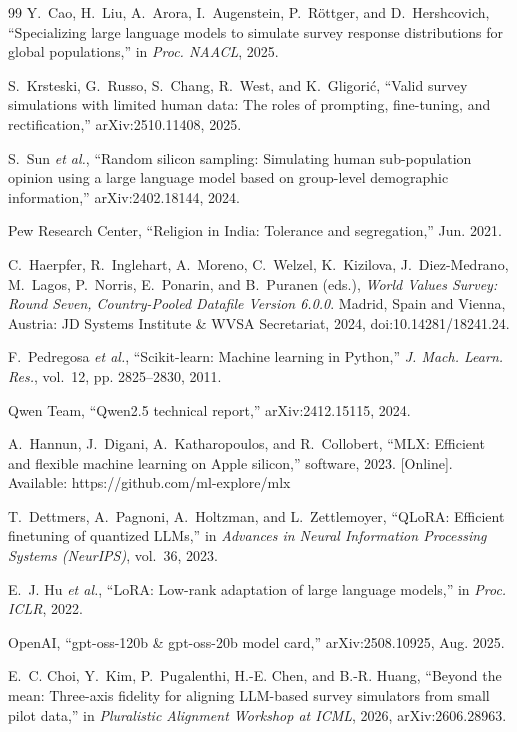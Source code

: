 \documentclass[conference]{IEEEtran}
\begin{document}
\begin{thebibliography}{99}
Y.~Cao, H.~Liu, A.~Arora, I.~Augenstein, P.~R\"{o}ttger, and D.~Hershcovich, ``Specializing large language models to simulate survey response distributions for global populations,'' in \emph{Proc. NAACL}, 2025.

S.~Krsteski, G.~Russo, S.~Chang, R.~West, and K.~Gligori\'{c}, ``Valid survey simulations with limited human data: The roles of prompting, fine-tuning, and rectification,'' arXiv:2510.11408, 2025.

S.~Sun \emph{et al.}, ``Random silicon sampling: Simulating human sub-population opinion using a large language model based on group-level demographic information,'' arXiv:2402.18144, 2024.

Pew Research Center, ``Religion in India: Tolerance and segregation,'' Jun. 2021.

C.~Haerpfer, R.~Inglehart, A.~Moreno, C.~Welzel, K.~Kizilova, J.~Diez-Medrano, M.~Lagos, P.~Norris, E.~Ponarin, and B.~Puranen (eds.), \emph{World Values Survey: Round Seven, Country-Pooled Datafile Version 6.0.0}. Madrid, Spain and Vienna, Austria: JD Systems Institute \& WVSA Secretariat, 2024, doi:10.14281/18241.24.

F.~Pedregosa \emph{et al.}, ``Scikit-learn: Machine learning in Python,'' \emph{J. Mach. Learn. Res.}, vol.~12, pp. 2825--2830, 2011.

Qwen Team, ``Qwen2.5 technical report,'' arXiv:2412.15115, 2024.

A.~Hannun, J.~Digani, A.~Katharopoulos, and R.~Collobert, ``MLX: Efficient and flexible machine learning on Apple silicon,'' software, 2023. [Online]. Available: https://github.com/ml-explore/mlx

T.~Dettmers, A.~Pagnoni, A.~Holtzman, and L.~Zettlemoyer, ``QLoRA: Efficient finetuning of quantized LLMs,'' in \emph{Advances in Neural Information Processing Systems (NeurIPS)}, vol.~36, 2023.

E.~J. Hu \emph{et al.}, ``LoRA: Low-rank adaptation of large language models,'' in \emph{Proc. ICLR}, 2022.

OpenAI, ``gpt-oss-120b \& gpt-oss-20b model card,'' arXiv:2508.10925, Aug. 2025.

E.~C. Choi, Y.~Kim, P.~Pugalenthi, H.-E. Chen, and B.-R. Huang, ``Beyond the mean: Three-axis fidelity for aligning LLM-based survey simulators from small pilot data,'' in \emph{Pluralistic Alignment Workshop at ICML}, 2026, arXiv:2606.28963.


\end{thebibliography}
\end{document}
